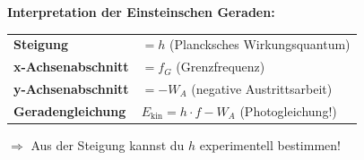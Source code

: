 \documentclass[11pt,a4paper]{article}
\begin{document}
\begin{tcolorbox}[merksatz]
\textbf{Interpretation der Einsteinschen Geraden:}

\vspace{0.3em}
\begin{tabular}{ll}
\textbf{Steigung} & $= h$ (Plancksches Wirkungsquantum) \\
\textbf{x-Achsenabschnitt} & $= f_G$ (Grenzfrequenz) \\
\textbf{y-Achsenabschnitt} & $= -W_A$ (negative Austrittsarbeit) \\
\textbf{Geradengleichung} & $E_{\text{kin}} = h \cdot f - W_A$ (Photogleichung!) \\
\end{tabular}

\vspace{0.3em}
$\Rightarrow$ Aus der Steigung kannst du $h$ experimentell bestimmen!
\end{tcolorbox}
\end{document}
